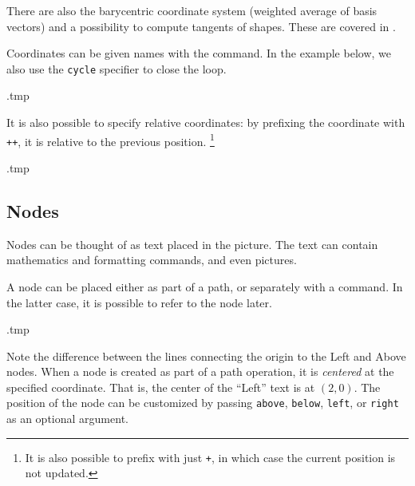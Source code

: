 There are also the barycentric coordinate system (weighted average of basis vectors)
and a possibility to compute tangents of shapes.
These are covered in \cite[Section~13.2]{tikz}.

Coordinates can be given names with the  command.
In the example below, we also use the \verb|cycle| specifier to close the loop.
%
\begin{VerbatimOut}{\jobname.tmp}
\end{VerbatimOut}
\ShowExample

It is also possible to specify relative coordinates:
by prefixing the coordinate with \verb|++|, it is relative to the previous position.%
\footnote{It is also possible to prefix with just \texttt{+},
in which case the current position is not updated.}
%
\begin{VerbatimOut}{\jobname.tmp}
\end{VerbatimOut}
\ShowExample


%
%
\subsection{Nodes}

Nodes can be thought of as text placed in the picture.
The text can contain mathematics and formatting commands, and even pictures.

A node can be placed either as part of a path, or separately with a  command.
In the latter case, it is possible to refer to the node later.
%
\begin{VerbatimOut}{\jobname.tmp}
\end{VerbatimOut}
\ShowExample

Note the difference between the lines connecting the origin to the Left and Above nodes.
When a node is created as part of a path operation,
it is \emph{centered} at the specified coordinate.
That is, the center of the ``Left'' text is at $(2,0)$.
The position of the node can be customized by passing
\verb|above|, \verb|below|, \verb|left|, or \verb|right| as an optional argument.

